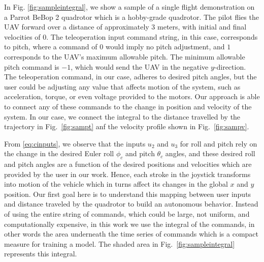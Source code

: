 \documentclass[letterpaper, 10 pt, conference]{ieeeconf}  %
\newcommand\NB[1]{$\spadesuit$\footnote{NB: #1}}
\begin{document}
In Fig. \ref{fig:sampleintegral}, we show a sample of a single flight demonstration on a Parrot BeBop 2 quadrotor which is a hobby-grade quadrotor. The pilot flies the UAV forward over a distance of approximately $3$ meters, with initial and final velocities of $0$. The teleoperation input command string, in this case, corresponds to pitch, where a command of $0$ would imply no pitch adjustment, and $1$ corresponds to the UAV's maximum allowable pitch. The minimum allowable pitch command is $-1$, which would send the UAV in the negative $y$-direction. The teleoperation command, in our case, adheres to desired pitch angles, but the user could be adjusting any value that affects motion of the system, such as acceleration, torque, or even voltage provided to the motors. Our approach is able to connect any of these commands to the change in position  and velocity of the system. In our case, we connect the integral to the distance travelled by the trajectory in Fig.~\ref{fig:sampt} anf the velocity profile shown in Fig.~\ref{fig:sampv}.



From \eqref{eq:cinputs}, we observe that the inputs $u_2$ and $u_3$ for roll and pitch rely on the change in the desired Euler roll $\phi_c$ and pitch $\theta_c$ angles, and these desired roll and pitch angles are a function of the desired positions and velocities which are provided by the user in our work. 
Hence, each stroke in the joystick transforms into motion of the vehicle which in turns affect its changes in the global $x$ and $y$ position. Our first goal here is to understand this mapping between user inputs and distance traveled by the quadrotor to build an autonomous behavior. Instead of using the entire string of commands, which could be large, not uniform, and computationally expensive, in this work we use the integral of the commands, in other words the area underneath the time series of commands which is a compact measure for training a model. The shaded area in Fig.~\ref{fig:sampleintegral} represents this integral. 

\end{document}
